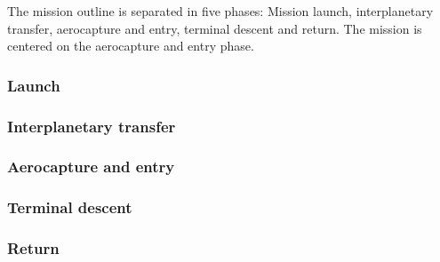 The mission outline is separated in five phases: Mission launch, interplanetary transfer, aerocapture and entry, terminal descent and return. The mission is centered on the aerocapture and entry phase. %

\subsubsection{Launch} \label{sec:launch}


\subsubsection{Interplanetary transfer} \label{sec:interplanetary}


\subsubsection{Aerocapture and entry} \label{sec:entry}


\subsubsection{Terminal descent} \label{sec:terminal}


%

\subsubsection{Return} \label{sec:return}






